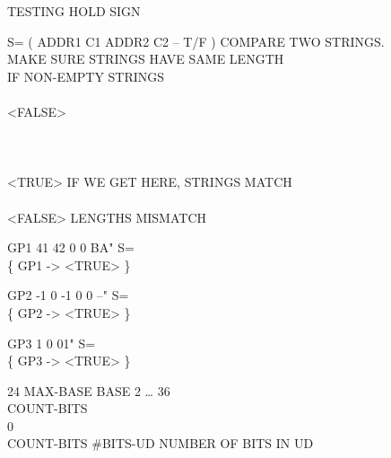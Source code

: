 \begin{tt}
TESTING     HOLD SIGN    

\word{:} S=   ( ADDR1 C1 ADDR2 C2 -- T/F ) COMPARE TWO STRINGS. \\
\tab	{}   \word{=} 	\tab[4.9]  MAKE SURE STRINGS HAVE SAME LENGTH \\
\tab[2]     				\tab[6]  IF NON-EMPTY STRINGS \\
  \\
\tab[4]           \word{-}
				  <FALSE>    \\
\tab[4]           \\
\tab[3]      \\
\tab[2]    \\
\tab[2]    <TRUE>								\tab[5.2]  IF WE GET HERE, STRINGS MATCH \\
\tab    {} \\
\tab[2]      <FALSE>		\tab {} LENGTHS MISMATCH \\
\tab    {} \word{;}

\word{:} GP1   41  42  0 0   BA" S= \word{;} \\
\{ GP1 -> <TRUE> \}

\word{:} GP2   -1  0  -1  0 0   --" S= \word{;} \\
\{ GP2 -> <TRUE> \}

\word{:} GP3   1 0     01" S= \word{;} \\
\{ GP3 -> <TRUE> \}

24  MAX-BASE							\tab[6.2]  BASE 2 {\ldots} 36 \\
\word{:} COUNT-BITS \\
 0 
	       
	 \word{;} \\
COUNT-BITS   \#BITS-UD		\tab {} NUMBER OF BITS IN UD \\


\end{tt}
